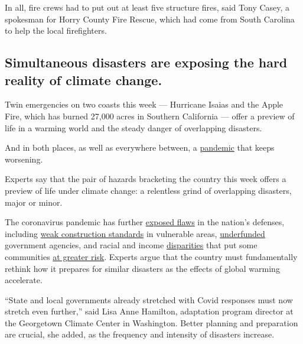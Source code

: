 In all, fire crews had to put out at least five structure fires, said
Tony Casey, a spokesman for Horry County Fire Rescue, which had come
from South Carolina to help the local firefighters.

\hypertarget{simultaneous-disasters-are-exposing-the-hard-reality-of-climate-change}{%
\subsection{Simultaneous disasters are exposing the hard reality of
climate
change.}\label{simultaneous-disasters-are-exposing-the-hard-reality-of-climate-change}}

Twin emergencies on two coasts this week --- Hurricane Isaias and the
Apple Fire, which has burned 27,000 acres in Southern California ---
offer a preview of life in a warming world and the steady danger of
overlapping disasters.

And in both places, as well as everywhere between, a
\href{https://www.nytimes3xbfgragh.onion/interactive/2020/world/coronavirus-maps.html}{pandemic}
that keeps worsening.

Experts say that the pair of hazards bracketing the country this week
offers a preview of life under climate change: a relentless grind of
overlapping disasters, major or minor.

The coronavirus pandemic has further
\href{https://www.nytimes3xbfgragh.onion/2020/05/22/climate/fema-volunteer-disaster-response.html}{exposed
flaws} in the nation's defenses, including
\href{https://www.nytimes3xbfgragh.onion/2019/10/26/climate/building-codes-secret-deal.html}{weak
construction standards} in vulnerable areas,
\href{https://newrepublic.com/article/158486/towns-arent-equipped-handle-climate-emergencies}{underfunded}
government agencies, and racial and income
\href{https://www.nytimes3xbfgragh.onion/2020/05/17/climate/pollution-poverty-coronavirus.html}{disparities}
that put some communities
\href{https://www.nytimes3xbfgragh.onion/2020/07/24/climate/houston-flooding-race.html}{at
greater risk}. Experts argue that the country must fundamentally rethink
how it prepares for similar disasters as the effects of global warming
accelerate.

``State and local governments already stretched with Covid responses
must now stretch even further,'' said Lisa Anne Hamilton, adaptation
program director at the Georgetown Climate Center in Washington. Better
planning and preparation are crucial, she added, as the frequency and
intensity of disasters increase.

